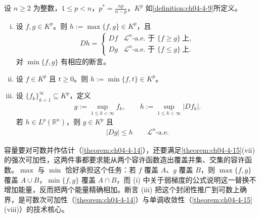 \documentclass[../../main.tex]{subfiles}%
\begin{document}
\begin{theorem}[$K^p$ 的性质]\label{theorem:ch04-4-13}
设 $n\geqslant2$ 为整数，$1\leqslant p<n$，$p^*=\frac{np}{n-p}$，$K^p$ 如\cref{definition:ch04-4-9}所定义。%
\begin{enumerate}[(i)]
\item 设 $f,g\in K^p$。则 $h:=\max\{f,g\}\in K^p$，且
\begin{align*}
Dh=
\begin{cases}
Df & \mathcal{L}^n\text{-a.e. 于 }\{f\geqslant g\}\ \text{上},\\[2pt]
Dg & \mathcal{L}^n\text{-a.e. 于 }\{f\leqslant g\}\ \text{上}.
\end{cases}
\end{align*}
对 $\min\{f,g\}$ 有相应的断言。
\item 设 $f\in K^p$ 且 $t\geqslant0$。则 $h:=\min\{f,t\}\in K^p$。
\item 设 $\{f_k\}_{k=1}^{\infty}\subseteq K^p$，定义
\begin{align*}
g:=\sup_{1\leqslant k<\infty}f_k,\qquad h:=\sup_{1\leqslant k<\infty}\lvert Df_k\rvert .
\end{align*}
若 $h\in L^p(\mathbb{R}^n)$，则 $g\in K^p$ 且
\begin{align*}
\lvert Dg\rvert\leqslant h\qquad\mathcal{L}^n\text{-a.e.}
\end{align*}
\end{enumerate}
\end{theorem}

\begin{remark}\label{remark:ch04-thm-4-13-动机}
容量要对可数并作估计（\cref{theorem:ch04-4-14}），还要满足\cref{theorem:ch04-4-15}(vii) 的强次可加性，这两件事都要求能从两个容许函数造出覆盖并集、交集的容许函数。$\max$ 与 $\min$ 恰好承担这个任务：若 $f$ 覆盖 $A$、$g$ 覆盖 $B$，则 $\max\{f,g\}$ 覆盖 $A\cup B$，$\min\{f,g\}$ 覆盖 $A\cap B$，而 (i) 中关于弱梯度的公式说明这一替换不增加能量，反而把两个能量精确相加。断言 (iii) 把这个封闭性推广到可数上确界，是可数次可加性（\cref{theorem:ch04-4-14}）与单调收敛性（\cref{theorem:ch04-4-15}(viii)）的技术核心。%
\end{remark}
\end{document}
